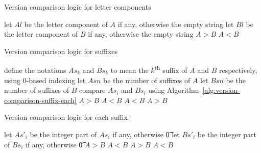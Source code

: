 \begin{algorithm}
\caption{Version comparison logic for letter components} \label{alg:version-comparison-letter}
\begin{algorithmic}[1]
  \STATE let $Al$ be the letter component of $A$ if any, otherwise the empty string
  \STATE let $Bl$ be the letter component of $B$ if any, otherwise the empty string
    \RETURN $A>B$
    \RETURN $A<B$
  \ENDIF
\end{algorithmic}
\end{algorithm}

\begin{algorithm}
\caption{Version comparison logic for suffixes} \label{alg:version-comparison-suffix}
\begin{algorithmic}[1]
  \STATE define the notations $As_k$ and $Bs_k$ to mean the $k$\textsuperscript{th} suffix of $A$
      and $B$ respectively, using $0$-based indexing
  \STATE let $Asn$ be the number of suffixes of $A$
  \STATE let $Bsn$ be the number of suffixes of $B$
    \STATE compare $As_i$ and $Bs_i$ using Algorithm~\ref{alg:version-comparison-suffix-each}
  \ENDFOR
      \RETURN $A>B$
    \ELSE
      \RETURN $A<B$
    \ENDIF
      \RETURN $A<B$
    \ELSE
      \RETURN $A>B$
    \ENDIF
  \ENDIF
\end{algorithmic}
\end{algorithm}

\begin{algorithm}
\caption{Version comparison logic for each suffix} \label{alg:version-comparison-suffix-each}
\begin{algorithmic}[1]
    \STATE let $As'_i$ be the integer part of $As_i$ if any, otherwise \t{0}
    \STATE let $Bs'_i$ be the integer part of $Bs_i$ if any, otherwise \t{0}
      \RETURN $A>B$
      \RETURN $A<B$
    \ENDIF
    \RETURN $A>B$
  \ELSE
    \RETURN $A<B$
  \ENDIF
\end{algorithmic}
\end{algorithm}

